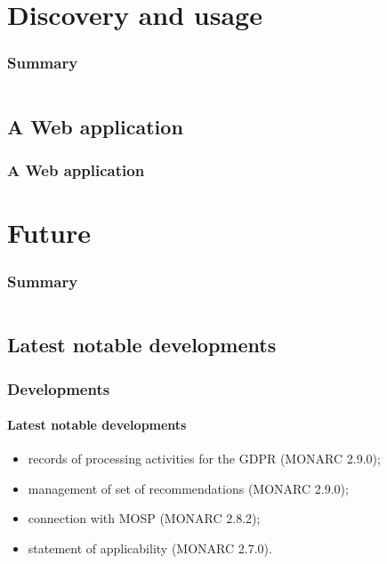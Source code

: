 %
%
\section{Discovery and usage}
\begin{frame}
    \frametitle{Summary}
    \begin{columns}[t]
        \begin{column}{5cm}
            \tableofcontents[sections={1-3}, currentsection, hideothersubsections]
        \end{column}
        \begin{column}{5cm}
            \tableofcontents[sections={4-5}, currentsection, hideothersubsections]
        \end{column}
    \end{columns}
\end{frame}
\subsection{A Web application}
\begin{frame}
    \frametitle{A Web application}
    \framesubtitle{}
\end{frame}




%
%
\section{Future}
\begin{frame}
    \frametitle{Summary}
    \begin{columns}[t]
        \begin{column}{5cm}
            \tableofcontents[sections={1-3}, currentsection, hideothersubsections]
        \end{column}
        \begin{column}{5cm}
            \tableofcontents[sections={4-5}, currentsection, hideothersubsections]
        \end{column}
    \end{columns}
\end{frame}

\subsection{Latest notable developments}
\begin{frame}
    \frametitle{Developments}
    \framesubtitle{Latest notable developments}
    \begin{itemize}
        \item records of processing activities for the GDPR (MONARC 2.9.0);
        \item management of set of recommendations (MONARC 2.9.0);
        \item connection with MOSP (MONARC 2.8.2);
        \item statement of applicability (MONARC 2.7.0).
    \end{itemize}
\end{frame}

